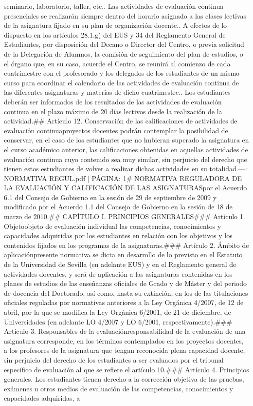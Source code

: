 \documentclass{article}
\begin{document}
\begin{itemize}
{{{{seminario, laboratorio, taller, etc.\n{}. Las actividades de evaluación continua presenciales se realizarán siempre dentro del horario asignado a las clases lectivas de la asignatura fijado en su plan de organización docente.\n{}. A efectos de lo dispuesto en los artículos 28.1.g) del EUS y 34 del Reglamento General de Estudiantes, por disposición del Decano o Director del Centro, o previa solicitud de la Delegación de Alumnos, la comisión de seguimiento del plan de estudios, o el órgano que, en su caso, acuerde el Centro, se reunirá al comienzo de cada cuatrimestre con el profesorado y los delegados de los estudiantes de un mismo curso para coordinar el calendario de las actividades de evaluación continua de las diferentes asignaturas y materias de dicho cuatrimestre.\n{}. Los estudiantes deberán ser informados de los resultados de las actividades de evaluación continua en el plazo máximo de 20 días lectivos desde la realización de la actividad.\n\n## Artículo 12. Conservación de las calificaciones de actividades de evaluación continua\n\nLos proyectos docentes podrán contemplar la posibilidad de conservar, en el caso de los estudiantes que no hubieran superado la asignatura en el curso académico anterior, las calificaciones obtenidas en aquellas actividades de evaluación continua cuyo contenido sea muy similar, sin perjuicio del derecho que tienen estos estudiantes de volver a realizar dichas actividades en su totalidad.\n\n---\n\nFUENTE: NORMATIVA REGUL.pdf | PÁGINA: 1\n# NORMATIVA REGULADORA DE LA EVALUACIÓN Y CALIFICACIÓN DE LAS ASIGNATURAS\n\nAprobado por el Acuerdo 6.1 del Consejo de Gobierno en la sesión de 29 de septiembre de 2009 y modificado por el Acuerdo 1.1 del Consejo de Gobierno en la sesión de 18 de marzo de 2010.\n\n## CAPÍTULO I. PRINCIPIOS GENERALES\n\n### Artículo 1. Objeto\n{} objeto de evaluación individual las competencias, conocimientos y capacidades adquiridas por los estudiantes en relación con los objetivos y los contenidos fijados en los programas de la asignaturas.\n\n### Artículo 2. Ámbito de aplicación\n\nLa presente normativa se dicta en desarrollo de lo previsto en el Estatuto de la Universidad de Sevilla (en adelante EUS) y en el Reglamento general de actividades docentes, y será de aplicación a las asignaturas contenidas en los planes de estudios de las enseñanzas oficiales de Grado y de Máster y del periodo de docencia del Doctorado, así como, hasta su extinción, en los de las titulaciones oficiales reguladas por normativas anteriores a la Ley Orgánica 4/2007, de 12 de abril, por la que se modifica la Ley Orgánica 6/2001, de 21 de diciembre, de Universidades (en adelante LO 4/2007 y LO 6/2001, respectivamente).\n\n### Artículo 3. Responsables de la evaluación\n\nLa responsabilidad de la evaluación de una asignatura corresponde, en los términos contemplados en los proyectos docentes, a los profesores de la asignatura que tengan reconocida plena capacidad docente, sin perjuicio del derecho de los estudiantes a ser evaluados por el tribunal específico de evaluación al que se refiere el artículo 10.\n\n### Artículo 4. Principios generales\n{}. Los estudiantes tienen derecho a la corrección objetiva de las pruebas, exámenes u otros medios de evaluación de las competencias, conocimientos y capacidades adquiridas, a }}}}
\end{itemize}
\end{document}
